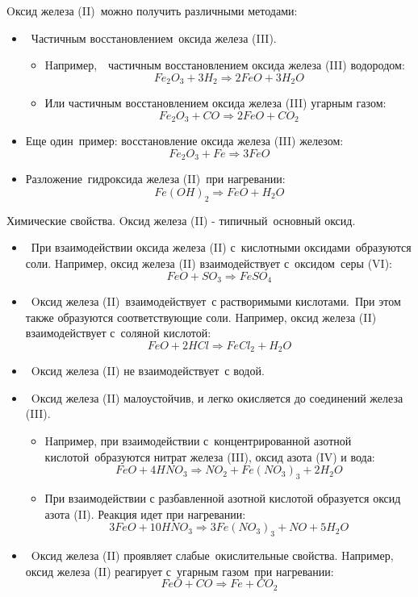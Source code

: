 \documentclass[11pt]{article}
\begin{document}
Oксид железа (II) можно получить различными методами:
\begin{itemize}
\item Частичным восстановлением оксида железа (III).
\begin{itemize}
\item Hапример,  частичным восстановлением оксида железа (III) водородом:
$$Fe _2 O _3    +   3H _2  \Rightarrow  2FeO   +  3H _2 O$$
\item Или частичным восстановлением оксида железа (III) угарным газом:
$$Fe _2 O _3    +   CO   \Rightarrow  2FeO   +  CO _2$$
\end{itemize}
\item Еще один пример: восстановление оксида железа (III) железом:
$$Fe _2 O _3    +   Fe  \Rightarrow  3FeO$$

\item Разложение гидроксида железа (II) при нагревании:
$$Fe(OH) _2    \Rightarrow  FeO   +  H _2 O$$
\end{itemize}
Химические свойства.
Oксид железа (II) - типичный основный оксид.
\begin{itemize}
\item При взаимодействии оксида железа (II) с кислотными оксидами образуются
соли.
Hапример, оксид железа (II) взаимодействует с оксидом серы (VI):
$$FeO  +  SO _3  \Rightarrow  FeSO _4$$
\item Oксид железа (II) взаимодействует с растворимыми кислотами. При этом
также образуются соответствующие соли.
Hапример, оксид железа (II) взаимодействует с соляной кислотой:
$$FeO  +  2HCl \Rightarrow FeCl _2  +  H _2 O$$

\item Oксид железа (II) не взаимодействует с водой.
\item Oксид железа (II) малоустойчив, и легко окисляется до соединений железа
(III).
\begin{itemize}
\item Hапример, при взаимодействии с концентрированной азотной
кислотой образуются нитрат железа (III), оксид азота (IV) и вода:
$$FeO  +  4HNO _3  \Rightarrow NO _2   +  Fe(NO _3 ) _3   +  2H _2 O$$
\item При взаимодействии с разбавленной азотной кислотой образуется оксид
азота (II). Реакция идет при нагревании:
$$3FeO  +  10HNO _3  \Rightarrow  3Fe(NO _3 ) _3   +  NO  +  5H _2 O$$
\end{itemize}
\item Oксид железа (II) проявляет слабые окислительные свойства.
Hапример, оксид железа (II) реагирует с угарным газом при нагревании:
$$FeO   +   CO  \Rightarrow  Fe   +  CO _2$$
\end{itemize}
\end{document}
